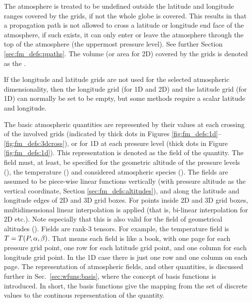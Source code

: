 The atmosphere is treated to be undefined outside the latitude and
longitude ranges covered by the grids, if not the whole globe is
covered. This results in that a propagation path is not allowed to
cross a latitude or longitude end face of the atmosphere, if such
exists, it can only enter or leave the atmosphere through the top of
the atmosphere (the uppermost pressure level). See further
Section \ref{sec:fm_defs:ppaths}. The volume (or area for 2D) covered
by the grids is denoted as the .

If the longitude and latitude grids are not used for the selected atmospheric
dimensionality, then the longitude grid (for 1D and 2D) and the latitude grid
(for 1D) can normally be set to be empty, but some methods require a scalar
latitude and longitude. 

The basic atmospheric quantities are represented by their values at each
crossing of the involved grids (indicated by thick dots in Figures
\ref{fig:fm_defs:1d}--\ref{fig:fm_defs:3dcross}), or for 1D at each pressure
level (thick dots in Figure \ref{fig:fm_defs:1d}). This representation is
denoted as the field of the quantity. The field must,
at least, be specified for the geometric altitude of the pressure levels
(), the temperature () and considered
atmospheric species (). The fields are assumed to be
piece-wise linear functions vertically (with pressure altitude as the vertical
coordinate, Section \ref{sec:fm_defs:altitudes}), and along the latitude and
longitude edges of 2D and 3D grid boxes. For points inside 2D and 3D grid
boxes, multidimensional linear interpolation is applied (that is, bi-linear
interpolation for 2D etc.). Note especially that this is also valid for the
field of geometrical altitudes (). Fields are rank-3
tensors. For example, the temperature field is $T=T(P,\alpha,\beta)$. That
means each field is like a book, with one page for each pressure grid point,
one row for each latitude grid point, and one column for each longitude grid
point. In the 1D case there is just one row and one column on each page. The
representation of atmospheric fields, and other quantities, is discussed
further in Sec.~\ref{sec:wfuns:basis}, where the concept of basis
functions is introduced. In short, the basis functions
give the mapping from the set of discrete values to the continous
representation of the quantity.




